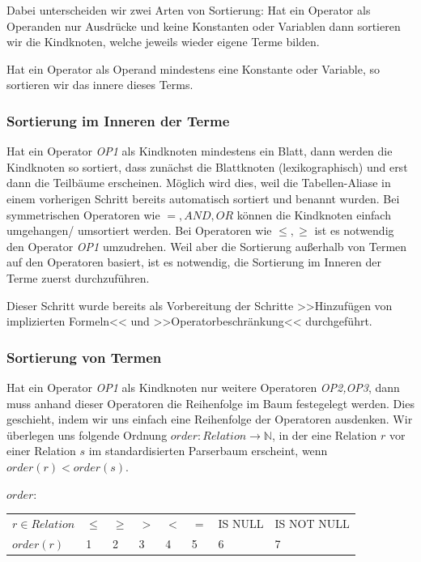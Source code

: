 Dabei unterscheiden wir zwei Arten von Sortierung: Hat ein Operator als Operanden nur Ausdrücke und keine Konstanten oder Variablen dann sortieren wir die Kindknoten, welche jeweils wieder eigene Terme bilden.

Hat ein Operator als Operand mindestens eine Konstante oder Variable, so sortieren wir das innere dieses Terms.

\subsubsection{Sortierung im Inneren der Terme}

Hat ein Operator \textit{OP1} als Kindknoten mindestens ein Blatt, dann werden die Kindknoten so sortiert, dass zunächst die Blattknoten (lexikographisch) und erst dann die Teilbäume erscheinen. Möglich wird dies, weil die Tabellen-Aliase in einem vorherigen Schritt bereits automatisch sortiert und benannt wurden. Bei symmetrischen Operatoren wie $=,  \textit{AND}, \textit{OR}$ können die Kindknoten einfach umgehangen/ umsortiert werden. Bei Operatoren wie $\le,\ge$ ist es notwendig den Operator \textit{OP1} umzudrehen. Weil aber die Sortierung außerhalb von Termen auf den Operatoren basiert, ist es notwendig, die Sortierung im Inneren der Terme zuerst durchzuführen.

Dieser Schritt wurde bereits als Vorbereitung der Schritte >>Hinzufügen von implizierten Formeln<< und >>Operatorbeschränkung<< durchgeführt. 

\subsubsection{Sortierung von Termen}

Hat ein Operator \textit{OP1} als Kindknoten nur weitere Operatoren \textit{OP2,OP3}, dann muss anhand dieser Operatoren die Reihenfolge im Baum festegelegt werden. Dies geschieht, indem wir uns einfach eine Reihenfolge der Operatoren ausdenken. Wir überlegen uns folgende Ordnung $order:\textit{Relation}\to\mathbb{N}$, in der eine Relation $r$ vor einer Relation $s$ im standardisierten Parserbaum erscheint, wenn $order(r) < order(s)$.

$order:$\\

\begin{tabular}{|llllllll|}
\hline
$r\in \textit{Relation}$ & $\le$ & $\ge$ & $>$ & $<$ & $=$ & IS NULL & IS NOT NULL  \\
$\textit{order}(r)$ & 1 & 2 & 3 & 4 & 5 & 6 & 7\\ 
\hline
\end{tabular}\\

